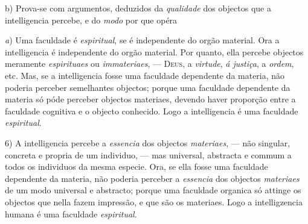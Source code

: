 b) Prova-se com argumentos, deduzidos da \emph{qualidade} dos objectos que a intelligencia percebe, e do \emph{modo} por que opéra

\emph{a}) Uma faculdade é \emph{espiritual}, se é independente do orgão material. Ora a intelligencia é independente do orgão material. Por quanto, ella percebe objectos meramente \emph{espirituaes} ou \emph{immateriaes}, --- \textsc{Deus}, a \emph{virtude}, \emph{á justiça}, a \emph{ordem}, etc. Mas, se a intelligencia fosse uma faculdade dependente da materia, não poderia perceber semelhantes objectos; porque uma faculdade dependente da materia só póde perceber objectos materiaes, devendo haver proporção entre a faculdade cognitiva e o objecto conhecido. Logo a intelligencia é uma faculdade \emph{espiritual}.

6) A intelligencia percebe a \emph{essencia} dos objectos \emph{materiaes}, --- não singular, concreta e propria de um individuo, --- mas universal, abstracta e commum a todos os individuos da mesma especie. Ora, se ella fosse uma faculdade dependente da materia, não poderia perceber a \emph{essencia} dos objectos \emph{materiaes}   de um modo universal e abstracto; porque uma faculdade organica só attinge os objectos que nella fazem impressão, e que são os materiaes. Logo a intelligzencia humana é uma faculdade \emph{espiritual}.

